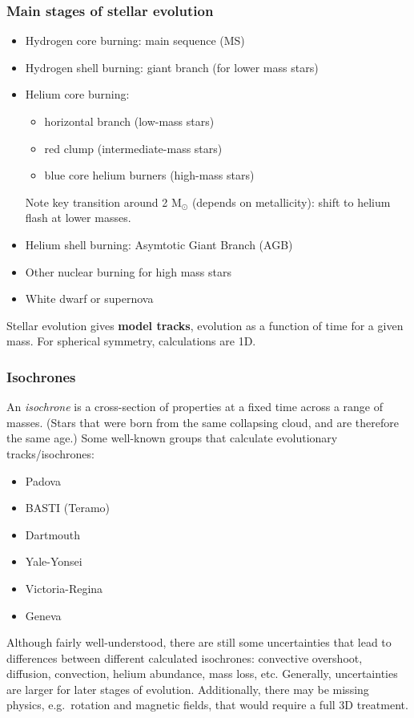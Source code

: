 \documentclass{article}
\newcommand{\mynotes}[1]{\textcolor{cadmiumgreen}{#1}}
\begin{document}
\subsubsection{Main stages of stellar evolution}
\begin{itemize}
    \item Hydrogen core burning: main sequence (MS)
    \item Hydrogen shell burning: giant branch (for lower mass
        stars)
    \item Helium core burning:
        \begin{itemize}
            \item horizontal branch (low-mass stars)
            \item red clump (intermediate-mass stars)
            \item blue core helium burners (high-mass stars)
        \end{itemize}
        Note key transition around 2 M$_{\odot}$
        (depends on metallicity): shift to helium
        flash at lower masses.
    \item Helium shell burning: Asymtotic Giant Branch (AGB)
    \item Other nuclear burning for high mass stars
    \item White dwarf or supernova
\end{itemize}
Stellar evolution gives \textbf{model tracks}, evolution as a function of
time for a given mass. For spherical symmetry, calculations are 1D.

\subsubsection{Isochrones}
An \textit{isochrone} is a cross-section of properties at a
fixed time across a range of masses.
\mynotes{(Stars that were born from the same collapsing cloud, and are therefore
the same age.)}
Some well-known groups that calculate evolutionary tracks/isochrones:
\begin{itemize}
    \item Padova
    \item BASTI (Teramo)
    \item Dartmouth
    \item Yale-Yonsei
    \item Victoria-Regina
    \item Geneva
\end{itemize}

Although fairly well-understood, there are still some
uncertainties that lead to differences between different
calculated isochrones: convective overshoot, diffusion, convection,
helium abundance, mass loss, etc. Generally, uncertainties are larger
for later stages of evolution. Additionally, there may be missing
physics, e.g.\ rotation and magnetic fields, that would require a full
3D treatment.
\end{document}
